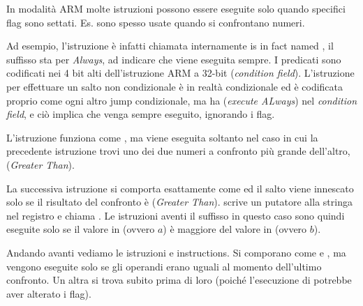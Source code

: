 \label{subsec:jcc_ARM}

\mysubparagraph{\OptimizingKeilVI (\ARMMode)}




In modalità ARM molte istruzioni possono essere eseguite solo quando specifici flag sono settati.
Es. sono spesso usate quando si confrontano numeri.


Ad esempio, l'istruzione \ADD è infatti chiamata internamente is in fact named , il suffisso  sta per
\emph{Always}, ad indicare che viene eseguita sempre.
I predicati sono codificati nei 4 bit alti dell'istruzione ARM a 32-bit (\emph{condition field}).
L'istruzione  per effettuare un salto non condizionale è in realtà condizionale ed è codificata proprio come ogni altro
jump condizionale, ma ha  (\emph{execute ALways}) nel \emph{condition field}, e ciò implica che venga sempre eseguito, ignorando i flag.


L'istruzione  funziona come , ma viene eseguita soltanto nel caso in cui la precedente istruzione \CMP
trovi uno dei due numeri a confronto più grande dell'altro, (\emph{Greater Than}).


La successiva istruzione  si comporta esattamente come  
ed il salto viene innescato solo se il risultato del confronto è (\emph{Greater Than}). 
 scrive un putatore alla stringa  nel registro  e  chiama \printf.
Le istruzioni aventi il suffisso  in questo caso sono quindi eseguite solo se il valore in  (ovvero $a$) è maggiore del valore 
in  (ovvero $b$).


Andando avanti vediamo le istruzioni  e  instructions.
Si comporano come  e , ma vengono eseguite solo se gli operandi erano uguali al momento dell'ultimo confronto.
Un altra \CMP si trova subito prima di loro (poiché l'esecuzione di \printf potrebbe aver alterato i flag).

